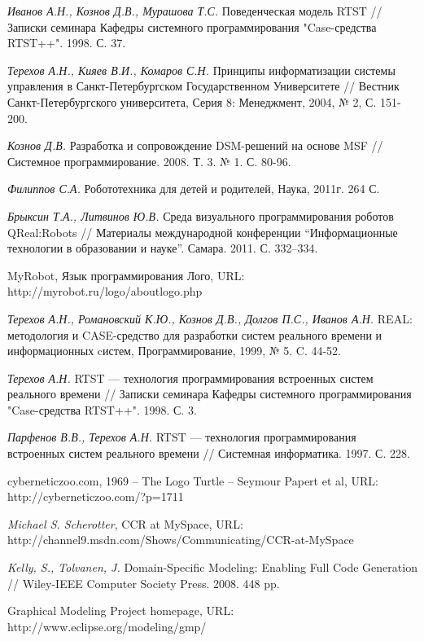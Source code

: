 \documentclass[a4paper]{article}
\begin{document}
\begin{thebibliography}{9001}
   \emph{Иванов А.Н., Кознов Д.В., Мурашова Т.С.} Поведенческая модель RTST // Записки семинара Кафедры системного программирования "Case-средства RTST++". 1998. С. 37.

   \emph{Терехов А.Н., Кияев В.И., Комаров С.Н.} Принципы информатизации системы управления в Санкт-Петербургском Государственном Университете // Вестник Санкт-Петербургского университета, Серия 8: Менеджмент, 2004, № 2, С. 151-200.

   \emph{Кознов Д.В.} Разработка и сопровождение DSM-решений на основе MSF // Системное программирование. 2008. Т. 3. № 1. С. 80-96.

   \emph{Филиппов С.А.} Робототехника для детей и родителей, Наука, 2011г. 264 С.

   \emph{Брыксин Т.А., Литвинов Ю.В.} Среда визуального программирования роботов QReal:Robots // Материалы международной конференции ``Информационные технологии в образовании и науке''. Самара. 2011. С. 332--334.

   MyRobot, Язык программирования Лого, URL: http://myrobot.ru/logo/aboutlogo.php   

   \emph{Терехов А.Н., Романовский К.Ю., Кознов Д.В., Долгов П.С., Иванов А.Н.} REAL: методология и CASE-средство для разработки систем реального времени и информационных cистем, Программирование, 1999, № 5. C. 44-52.

   \emph{Терехов А.Н.} RTST --- технология программирования встроенных систем реального времени // Записки семинара Кафедры системного программирования "Case-средства RTST++". 1998. С. 3.

   \emph{Парфенов В.В., Терехов А.Н.} RTST --- технология программирования встроенных систем реального времени // Системная информатика. 1997. С. 228.

   cyberneticzoo.com, 1969 – The Logo Turtle – Seymour Papert et al, URL: http://cyberneticzoo.com/?p=1711 

   \emph{Michael S. Scherotter}, CCR at MySpace, URL: http://channel9.msdn.com/Shows/Communicating/CCR-at-MySpace 

   \emph{Kelly, S., Tolvanen, J.} Domain-Specific Modeling: Enabling Full Code Generation // Wiley-IEEE Computer Society Press. 2008. 448 pp.

   Graphical Modeling Project homepage, URL: http://www.eclipse.org/modeling/gmp/ 


\end{thebibliography}
\end{document}
